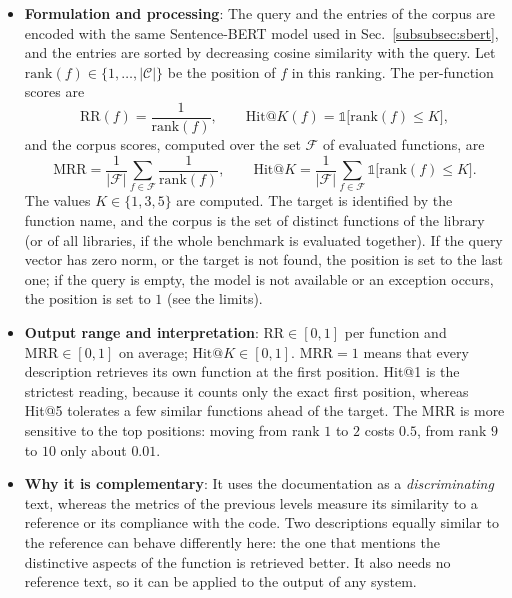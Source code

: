 \begin{itemize}[leftmargin=*, label=\textbullet]
	\item \textbf{Formulation and processing}: The query and the entries of the corpus are encoded
	with the same Sentence-BERT model used in Sec.~\ref{subsubsec:sbert}, and the entries are
	sorted by decreasing cosine similarity with the query. Let $\mathrm{rank}(f)\in\{1,\dots,|\mathcal{C}|\}$
	be the position of $f$ in this ranking. The per-function scores are
	\begin{equation}
		\mathrm{RR}(f)=\frac{1}{\mathrm{rank}(f)},
		\qquad
		\mathrm{Hit@}K(f)=\mathbb{1}\bigl[\mathrm{rank}(f)\le K\bigr],
		\label{eq:rr_hit}
	\end{equation}
	and the corpus scores, computed over the set $\mathcal{F}$ of evaluated functions, are
	\begin{equation}
		\mathrm{MRR}=\frac{1}{|\mathcal{F}|}\sum_{f\in\mathcal{F}}\frac{1}{\mathrm{rank}(f)},
		\qquad
		\mathrm{Hit@}K=\frac{1}{|\mathcal{F}|}\sum_{f\in\mathcal{F}}\mathbb{1}\bigl[\mathrm{rank}(f)\le K\bigr].
		\label{eq:mrr}
	\end{equation}
	The values $K\in\{1,3,5\}$ are computed. The target is identified by the function name, and the corpus is the set of distinct functions of the
	library (or of all libraries, if the whole benchmark is evaluated together). If the query vector has
	zero norm, or the target is not found, the position is set to the last one; if the query is empty,
	the model is not available or an exception occurs, the position is set to $1$ (see the limits).

	\item \textbf{Output range and interpretation}: $\mathrm{RR}\in[0,1]$ per function and
	$\mathrm{MRR}\in[0,1]$ on average; $\mathrm{Hit@}K\in[0,1]$. $\mathrm{MRR}=1$ means that every
	description retrieves its own function at the first position. Hit@1 is the strictest reading,
	because it counts only the exact first position, whereas Hit@5 tolerates a few similar
	functions ahead of the target. The MRR is more sensitive to the top positions: moving from rank
	$1$ to $2$ costs $0.5$, from rank $9$ to $10$ only about $0.01$.

	\item \textbf{Why it is complementary}: It uses the documentation as a \emph{discriminating}
	text, whereas the metrics of the previous levels measure its similarity to a reference or its
	compliance with the code. Two descriptions equally similar to the reference can behave
	differently here: the one that mentions the distinctive aspects of the function is retrieved
	better. It also needs no reference text, so it can be applied to the output of any system.


\end{itemize}
